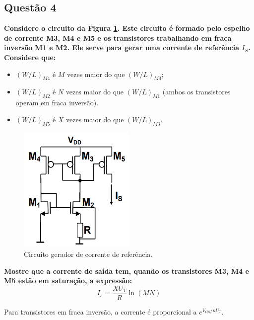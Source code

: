 ﻿\documentclass[12pt,a4paper]{article}
\begin{document}
\subsection*{Questão 4}
\begin{BoxQ}
    \textbf{Considere o circuito da Figura \ref{fig:gerador_corrente}. Este circuito é formado pelo espelho de corrente M3, M4 e M5 e os transistores trabalhando em fraca inversão M1 e M2. Ele serve para gerar uma corrente de referência $I_S$. Considere que:}
\end{BoxQ}\par
    \begin{itemize}
    \item $(W/L)_{M4}$ é $M$ vezes maior do que $(W/L)_{M3}$;
    \item $(W/L)_{M2}$ é $N$ vezes maior do que $(W/L)_{M1}$ (ambos os transistores operam em fraca inversão).
    \item $(W/L)_{M5}$ é $X$ vezes maior do que $(W/L)_{M3}$.
\end{itemize}

\begin{figure}[H]
    \centering
    \includegraphics[width=0.5\textwidth]{gerador_corrente_referencia.png}
    \caption{Circuito gerador de corrente de referência.}
    \label{fig:gerador_corrente}
\end{figure}

\textbf{Mostre que a corrente de saída tem, quando os transistores M3, M4 e M5 estão em saturação, a expressão:}
\begin{equation}
I_s = \frac{XU_T}{R} \ln(MN)
\end{equation}



Para transistores em fraca inversão, a corrente é proporcional a $e^{V_{GS}/nU_T}$. 
\end{document}
